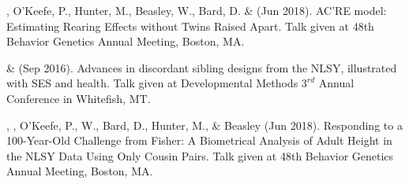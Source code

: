 
\item\meb, O'Keefe, P., Hunter, M., Beasley, W., Bard, D. \& \Joe (Jun 2018). AC'RE model: Estimating Rearing Effects without Twins Raised Apart. Talk given at 48th Behavior Genetics Annual Meeting, Boston, MA. 
\item\meb \& \joe (Sep 2016). Advances in discordant sibling designs from the NLSY, illustrated with SES and health. Talk given at Developmental Methods $3^{rd}$ Annual Conference in Whitefish, MT.\smallskip\\
%
\item\Joe, \meb, O'Keefe, P., W., Bard, D., Hunter, M., \& Beasley (Jun 2018). Responding to a 100-Year-Old Challenge from Fisher: A Biometrical Analysis of Adult Height in the NLSY Data Using Only Cousin Pairs. Talk given at 48th Behavior Genetics Annual Meeting, Boston, MA. 

